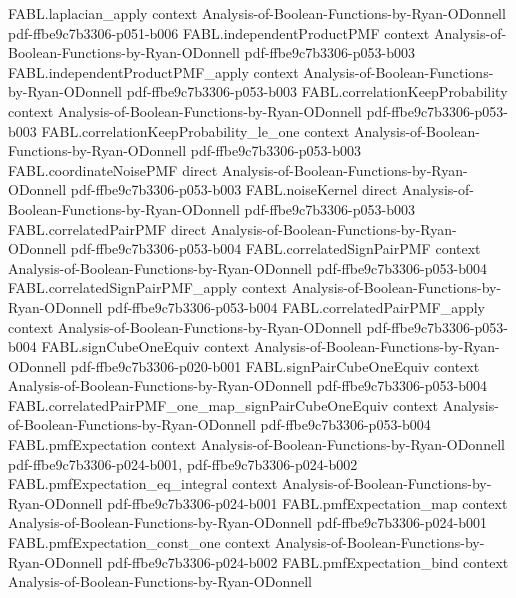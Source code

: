 \begin{theorem}
\proofstep
  {FABL.laplacian_apply}
  {context}
  {Analysis-of-Boolean-Functions-by-Ryan-ODonnell}
  {pdf-ffbe9c7b3306-p051-b006}
\proofstep
  {FABL.independentProductPMF}
  {context}
  {Analysis-of-Boolean-Functions-by-Ryan-ODonnell}
  {pdf-ffbe9c7b3306-p053-b003}
\proofstep
  {FABL.independentProductPMF_apply}
  {context}
  {Analysis-of-Boolean-Functions-by-Ryan-ODonnell}
  {pdf-ffbe9c7b3306-p053-b003}
\proofstep
  {FABL.correlationKeepProbability}
  {context}
  {Analysis-of-Boolean-Functions-by-Ryan-ODonnell}
  {pdf-ffbe9c7b3306-p053-b003}
\proofstep
  {FABL.correlationKeepProbability_le_one}
  {context}
  {Analysis-of-Boolean-Functions-by-Ryan-ODonnell}
  {pdf-ffbe9c7b3306-p053-b003}
\proofstep
  {FABL.coordinateNoisePMF}
  {direct}
  {Analysis-of-Boolean-Functions-by-Ryan-ODonnell}
  {pdf-ffbe9c7b3306-p053-b003}
\proofstep
  {FABL.noiseKernel}
  {direct}
  {Analysis-of-Boolean-Functions-by-Ryan-ODonnell}
  {pdf-ffbe9c7b3306-p053-b003}
\proofstep
  {FABL.correlatedPairPMF}
  {direct}
  {Analysis-of-Boolean-Functions-by-Ryan-ODonnell}
  {pdf-ffbe9c7b3306-p053-b004}
\proofstep
  {FABL.correlatedSignPairPMF}
  {context}
  {Analysis-of-Boolean-Functions-by-Ryan-ODonnell}
  {pdf-ffbe9c7b3306-p053-b004}
\proofstep
  {FABL.correlatedSignPairPMF_apply}
  {context}
  {Analysis-of-Boolean-Functions-by-Ryan-ODonnell}
  {pdf-ffbe9c7b3306-p053-b004}
\proofstep
  {FABL.correlatedPairPMF_apply}
  {context}
  {Analysis-of-Boolean-Functions-by-Ryan-ODonnell}
  {pdf-ffbe9c7b3306-p053-b004}
\proofstep
  {FABL.signCubeOneEquiv}
  {context}
  {Analysis-of-Boolean-Functions-by-Ryan-ODonnell}
  {pdf-ffbe9c7b3306-p020-b001}
\proofstep
  {FABL.signPairCubeOneEquiv}
  {context}
  {Analysis-of-Boolean-Functions-by-Ryan-ODonnell}
  {pdf-ffbe9c7b3306-p053-b004}
\proofstep
  {FABL.correlatedPairPMF_one_map_signPairCubeOneEquiv}
  {context}
  {Analysis-of-Boolean-Functions-by-Ryan-ODonnell}
  {pdf-ffbe9c7b3306-p053-b004}
\proofstep
  {FABL.pmfExpectation}
  {context}
  {Analysis-of-Boolean-Functions-by-Ryan-ODonnell}
  {pdf-ffbe9c7b3306-p024-b001,
    pdf-ffbe9c7b3306-p024-b002}
\proofstep
  {FABL.pmfExpectation_eq_integral}
  {context}
  {Analysis-of-Boolean-Functions-by-Ryan-ODonnell}
  {pdf-ffbe9c7b3306-p024-b001}
\proofstep
  {FABL.pmfExpectation_map}
  {context}
  {Analysis-of-Boolean-Functions-by-Ryan-ODonnell}
  {pdf-ffbe9c7b3306-p024-b001}
\proofstep
  {FABL.pmfExpectation_const_one}
  {context}
  {Analysis-of-Boolean-Functions-by-Ryan-ODonnell}
  {pdf-ffbe9c7b3306-p024-b002}
\proofstep
  {FABL.pmfExpectation_bind}
  {context}
  {Analysis-of-Boolean-Functions-by-Ryan-ODonnell}

\end{theorem}
